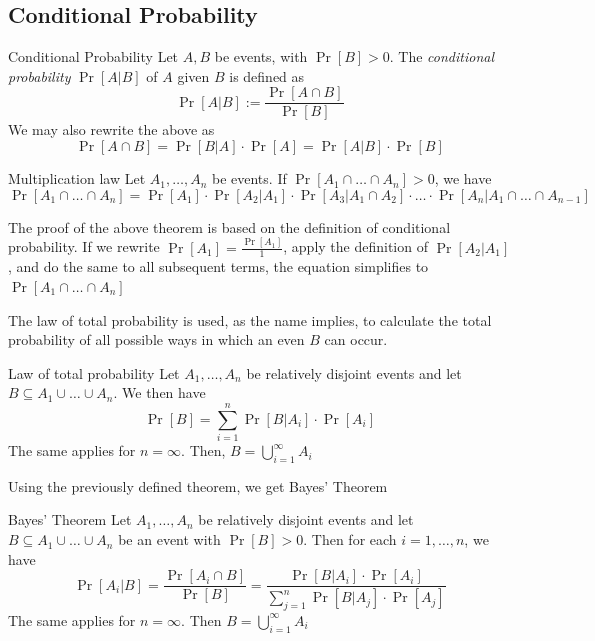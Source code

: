 \newpage
\subsection{Conditional Probability}
\setcounter{all}{8}
\begin{definition}[]{Conditional Probability}
    Let $A, B$ be events, with $\Pr[B] > 0$. The \textit{conditional probability} $\Pr[A|B]$ of $A$ given $B$ is defined as
    \[
        \Pr[A|B] := \frac{\Pr[A \cap B]}{\Pr[B]}
    \]
    We may also rewrite the above as
    \[
        \Pr[A \cap B] = \Pr[B|A] \cdot \Pr[A] = \Pr[A|B] \cdot \Pr[B]
    \]
\end{definition}

\setcounter{all}{10}
\begin{theorem}[]{Multiplication law}
    Let $A_1, \ldots, A_n$ be events. If $\Pr[A_1 \cap \ldots \cap A_n] > 0$, we have
    \[
        \Pr[A_1 \cap \ldots \cap A_n] = \Pr[A_1] \cdot \Pr[A_2|A_1] \cdot \Pr[A_3|A_1 \cap A_2] \cdot \ldots \cdot \Pr[A_n|A_1 \cap \ldots \cap A_{n - 1}]
    \]
\end{theorem}

The proof of the above theorem is based on the definition of conditional probability. If we rewrite $\Pr[A_1] = \frac{\Pr[A_1]}{1}$, apply the definition of $\Pr[A_2 | A_1]$, and do the same to all subsequent terms, the equation simplifies to $\Pr[A_1 \cap \ldots \cap A_n]$


 The law of total probability is used, as the name implies, to calculate the total probability of all possible ways in which an even $B$ can occur.
\setcounter{all}{13}
\begin{theorem}[]{Law of total probability}
    Let $A_1, \ldots, A_n$ be relatively disjoint events and let $B \subseteq A_1 \cup \ldots \cup A_n$. We then have
    \[
        \Pr[B] = \sum_{i = 1}^{n} \Pr[B|A_i] \cdot \Pr[A_i]
    \]
    The same applies for $n = \infty$. Then, $B = \bigcup_{i = 1}^{\infty} A_i$
\end{theorem}

Using the previously defined theorem, we get Bayes' Theorem

\setcounter{all}{15}
\begin{theorem}[]{Bayes' Theorem}
    Let $A_1, \ldots, A_n$ be relatively disjoint events and let $B \subseteq A_1 \cup \ldots \cup A_n$ be an event with $\Pr[B] > 0$. Then for each $i = 1, \ldots, n$, we have
    \[
        \Pr[A_i|B] = \frac{\Pr[A_i \cap B]}{\Pr[B]} = \frac{\Pr[B|A_i] \cdot \Pr[A_i]}{\sum_{j = 1}^{n} \Pr[B|A_j] \cdot \Pr[A_j]}
    \]
    The same applies for $n = \infty$. Then $B = \bigcup_{i = 1}^{\infty} A_i$
\end{theorem}

